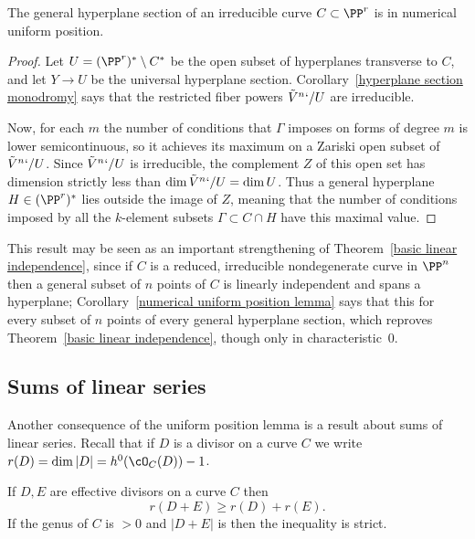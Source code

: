 \begin{corollary}\label{numerical
uniform position lemma}
The general hyperplane section of an irreducible curve
$C\subset \PP^r$ is in numerical uniform position.
\unif
\end{corollary}

\begin{proof} Let $U = (\PP^r)^* \setminus C^*$ be the open subset
of hyperplanes transverse to $C$, and let $Y\to U$ be the universal
hyperplane section.
Corollary~\ref{hyperplane section monodromy} says that the restricted
fiber powers $\tilde V^n`/U$ are irreducible.

Now, for each $m$ the number of conditions that $\Gamma$ imposes on
forms of degree $m$ is lower semicontinuous, so it achieves its maximum
on a Zariski open subset of $\tilde V^n`/U$. Since $\tilde V^n`/U$ is
irreducible, the complement $Z$ of this open set has dimension strictly
less than $\dim \tilde V^n`/U = \dim U$. Thus a general hyperplane $H
\in (\PP^r)^*$  lies outside the image of $Z$, meaning that the number
of conditions imposed by all the $k$-element subsets $\Gamma \subset C
\cap H$ have this maximal value.
\end{proof}

This result may be seen as an important strengthening of
Theorem~\ref{basic linear independence}, since if $C$ is a reduced,
irreducible nondegenerate curve in $\PP^n$ then a general subset
of $n$ points of $C$ is linearly independent and spans a hyperplane;
Corollary~\ref{numerical uniform position lemma} says that this 
for every subset of $n$ points of every general hyperplane section,
which reproves Theorem~\ref{basic linear independence}, though only in
characteristic~0.

\subsection*{Sums of linear series}

Another consequence of the uniform position lemma is a result about sums
of linear series.
Recall that if $D$ is a divisor on a curve $C$ we write $r(D) = \dim |D|
= h^0(\cO_C(D))-1$.

\begin{corollary}\label{Clifford equality plus}
If $D,E$ are effective divisors on a curve $C$ then
$$
r(D+E) \geq r(D)+r(E).
$$
If the genus of $C$ is $>0$ and $|D+E|$ is 
%
%
then the inequality is strict.
\end{corollary}

